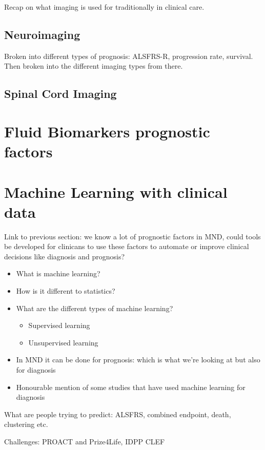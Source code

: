 Recap on what imaging is used for traditionally in clinical care.

\subsection{Neuroimaging}

Broken into different types of prognosis: ALSFRS-R, progression rate, survival.
Then broken into the different imaging types from there.

\subsection{Spinal Cord Imaging}

\section{Fluid Biomarkers prognostic factors}


\section{Machine Learning with clinical data}

Link to previous section: we know a lot of prognostic factors in MND, could tools be developed for clinicans to use these factors to automate or improve clinical decisions like diagnosis and prognosis?


\begin{itemize}
    \item What is machine learning?
    \item How is it different to statistics?
    \item What are the different types of machine learning?
    \begin{itemize}
        \item Supervised learning
        \item Unsupervised learning
    \end{itemize}
    \item In MND it can be done for prognosis: which is what we're looking at but also for diagnosis
    \item Honourable mention of some studies that have used machine learning for diagnosis
\end{itemize}

What are people trying to predict: ALSFRS, combined endpoint, death, clustering etc.

Challenges: PROACT and Prize4Life, IDPP CLEF

